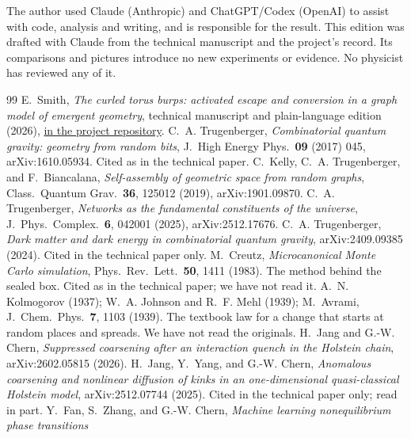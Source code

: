 \documentclass[11pt,letterpaper]{article}
\newcommand{\sub}[1]{\par\medskip{\color{ink}\large\bfseries #1}\par}
\begin{document}
\sub{Disclosure}
The author used Claude (Anthropic) and ChatGPT/Codex (OpenAI) to assist with code, analysis and
writing, and is responsible for the result. This edition was drafted with Claude from the technical
manuscript and the project's record. Its comparisons and pictures introduce no new experiments or
evidence. No physicist has reviewed any of it.

\renewcommand{\refname}{Sources}
\begin{thebibliography}{99}\small
 E.~Smith, \emph{The curled torus burps: activated escape and conversion in a graph model
of emergent geometry}, technical manuscript and plain-language edition (2026),
\href{https://github.com/EmilySmithCreate/RecreationalPhysics/tree/main/docs/papers/curled_torus}{in the project repository}.
 C.~A. Trugenberger, \emph{Combinatorial quantum gravity: geometry from random bits},
J.\ High Energy Phys.\ \textbf{09} (2017) 045, arXiv:1610.05934. Cited as in the technical paper.
 C.~Kelly, C.~A. Trugenberger, and F.~Biancalana, \emph{Self-assembly of geometric space
from random graphs}, Class.\ Quantum Grav.\ \textbf{36}, 125012 (2019), arXiv:1901.09870.
 C.~A. Trugenberger, \emph{Networks as the fundamental constituents of the universe},
J.\ Phys.\ Complex.\ \textbf{6}, 042001 (2025), arXiv:2512.17676.
 C.~A. Trugenberger, \emph{Dark matter and dark energy in combinatorial quantum gravity},
arXiv:2409.09385 (2024). Cited in the technical paper only.
 M.~Creutz, \emph{Microcanonical Monte Carlo simulation}, Phys.\ Rev.\ Lett.\ \textbf{50},
1411 (1983). The method behind the sealed box. Cited as in the technical paper; we have not read it.
 A.~N. Kolmogorov (1937); W.~A. Johnson and R.~F. Mehl (1939); M.~Avrami, J.\ Chem.\ Phys.\
\textbf{7}, 1103 (1939). The textbook law for a change that starts at random places and spreads. We
have not read the originals.
 H.~Jang and G.-W. Chern, \emph{Suppressed coarsening after an interaction quench in the
Holstein chain}, arXiv:2602.05815 (2026).
 H.~Jang, Y.~Yang, and G.-W. Chern, \emph{Anomalous coarsening and nonlinear diffusion of
kinks in an one-dimensional quasi-classical Holstein model}, arXiv:2512.07744 (2025). Cited in the
technical paper only; read in part.
 Y.~Fan, S.~Zhang, and G.-W. Chern, \emph{Machine learning nonequilibrium phase transitions
}
\end{thebibliography}
\end{document}
